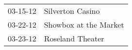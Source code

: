 \begin{supertabular}{p{0.07\textwidth}p{0.23\textwidth}}
 03-15-12 &       Silverton Casino \\
 03-22-12 &  Showbox at the Market \\
 03-23-12 &       Roseland Theater \\
\end{supertabular}
